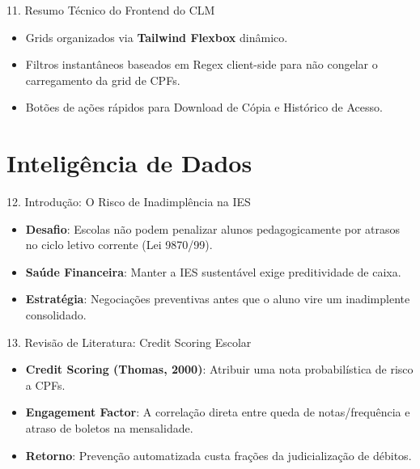 \documentclass[10pt, aspectratio=169]{beamer}
\begin{document}
\begin{frame}{11. Resumo Técnico do Frontend do CLM}
    \begin{itemize}
        \item Grids organizados via \textbf{Tailwind Flexbox} dinâmico.
        \item Filtros instantâneos baseados em Regex client-side para não congelar o carregamento da grid de CPFs.
        \item Botões de ações rápidos para Download de Cópia e Histórico de Acesso.
    \end{itemize}
\end{frame}

\section{Inteligência de Dados}

\begin{frame}{12. Introdução: O Risco de Inadimplência na IES}
    \begin{itemize}
        \item \textbf{Desafio}: Escolas não podem penalizar alunos pedagogicamente por atrasos no ciclo letivo corrente (Lei 9870/99).
        \item \textbf{Saúde Financeira}: Manter a IES sustentável exige preditividade de caixa.
        \item \textbf{Estratégia}: Negociações preventivas antes que o aluno vire um inadimplente consolidado.
    \end{itemize}
\end{frame}

\begin{frame}{13. Revisão de Literatura: Credit Scoring Escolar}
    \begin{itemize}
        \item \textbf{Credit Scoring (Thomas, 2000)}: Atribuir uma nota probabilística de risco a CPFs.
        \item \textbf{Engagement Factor}: A correlação direta entre queda de notas/frequência e atraso de boletos na mensalidade.
        \item \textbf{Retorno}: Prevenção automatizada custa frações da judicialização de débitos.
    \end{itemize}
\end{frame}
\end{document}
